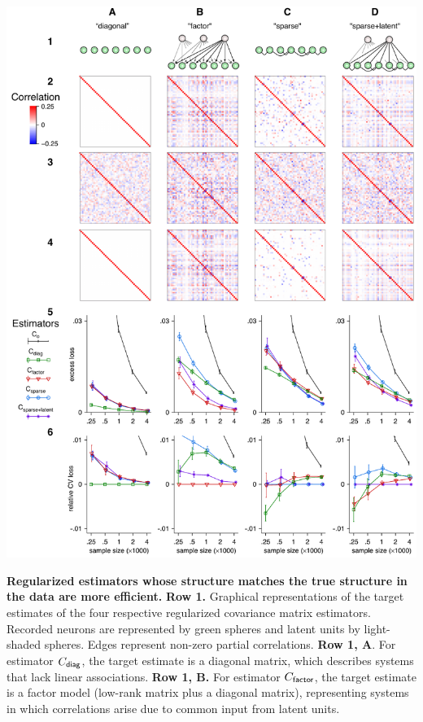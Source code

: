 \documentclass[10pt]{article}
\begin{document}
\begin{FPfigure}
    \begin{center}
        \includegraphics{./figures/Figure02.pdf}
    \end{center}
    \caption{{\bf Regularized estimators whose structure matches the true structure in the data are more efficient.}
        {\bf Row 1.} Graphical representations of the target estimates of the four respective regularized covariance matrix estimators.  Recorded neurons are represented by green spheres and latent units by light-shaded spheres.  Edges represent non-zero partial correlations.
        {\bf Row 1, A}.  For estimator $C_{\sf diag}$, the target estimate is a diagonal matrix, which describes systems that lack linear associations. 
        {\bf  Row 1, B.} For estimator $C_{\sf factor}$, the target estimate is a factor model (low-rank matrix plus a diagonal matrix), representing systems in which correlations arise due to common input from latent units. 
}
\end{FPfigure}
\end{document}
